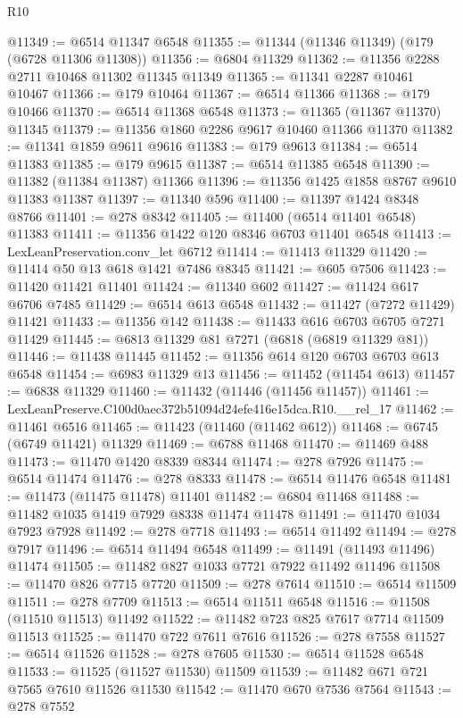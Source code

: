 \begin{lexlean}{R10}
\begin{coremodule}
@11349 := @6514 @11347 @6548
@11355 := @11344 (@11346 @11349) (@179 (@6728 @11306 @11308))
@11356 := @6804 @11329
@11362 := @11356 @2288 @2711 @10468 @11302 @11345 @11349
@11365 := @11341 @2287 @10461 @10467
@11366 := @179 @10464
@11367 := @6514 @11366
@11368 := @179 @10466
@11370 := @6514 @11368 @6548
@11373 := @11365 (@11367 @11370) @11345
@11379 := @11356 @1860 @2286 @9617 @10460 @11366 @11370
@11382 := @11341 @1859 @9611 @9616
@11383 := @179 @9613
@11384 := @6514 @11383
@11385 := @179 @9615
@11387 := @6514 @11385 @6548
@11390 := @11382 (@11384 @11387) @11366
@11396 := @11356 @1425 @1858 @8767 @9610 @11383 @11387
@11397 := @11340 @596
@11400 := @11397 @1424 @8348 @8766
@11401 := @278 @8342
@11405 := @11400 (@6514 @11401 @6548) @11383
@11411 := @11356 @1422 @120 @8346 @6703 @11401 @6548
@11413 := LexLeanPreservation.conv_let @6712
@11414 := @11413 @11329
@11420 := @11414 @50 @13 @618 @1421 @7486 @8345
@11421 := @605 @7506
@11423 := @11420 @11421 @11401
@11424 := @11340 @602
@11427 := @11424 @617 @6706 @7485
@11429 := @6514 @613 @6548
@11432 := @11427 (@7272 @11429) @11421
@11433 := @11356 @142
@11438 := @11433 @616 @6703 @6705 @7271 @11429
@11445 := @6813 @11329 @81 @7271 (@6818 (@6819 @11329 @81))
@11446 := @11438 @11445
@11452 := @11356 @614 @120 @6703 @6703 @613 @6548
@11454 := @6983 @11329 @13
@11456 := @11452 (@11454 @613)
@11457 := @6838 @11329
@11460 := @11432 (@11446 (@11456 @11457))
@11461 := LexLeanPreserve.C100d0aec372b51094d24efe416e15dca.R10.__rel_17
@11462 := @11461 @6516
@11465 := @11423 (@11460 (@11462 @612))
@11468 := @6745 (@6749 @11421) @11329
@11469 := @6788 @11468
@11470 := @11469 @488
@11473 := @11470 @1420 @8339 @8344
@11474 := @278 @7926
@11475 := @6514 @11474
@11476 := @278 @8333
@11478 := @6514 @11476 @6548
@11481 := @11473 (@11475 @11478) @11401
@11482 := @6804 @11468
@11488 := @11482 @1035 @1419 @7929 @8338 @11474 @11478
@11491 := @11470 @1034 @7923 @7928
@11492 := @278 @7718
@11493 := @6514 @11492
@11494 := @278 @7917
@11496 := @6514 @11494 @6548
@11499 := @11491 (@11493 @11496) @11474
@11505 := @11482 @827 @1033 @7721 @7922 @11492 @11496
@11508 := @11470 @826 @7715 @7720
@11509 := @278 @7614
@11510 := @6514 @11509
@11511 := @278 @7709
@11513 := @6514 @11511 @6548
@11516 := @11508 (@11510 @11513) @11492
@11522 := @11482 @723 @825 @7617 @7714 @11509 @11513
@11525 := @11470 @722 @7611 @7616
@11526 := @278 @7558
@11527 := @6514 @11526
@11528 := @278 @7605
@11530 := @6514 @11528 @6548
@11533 := @11525 (@11527 @11530) @11509
@11539 := @11482 @671 @721 @7565 @7610 @11526 @11530
@11542 := @11470 @670 @7536 @7564
@11543 := @278 @7552

\end{coremodule}
\end{lexlean}

